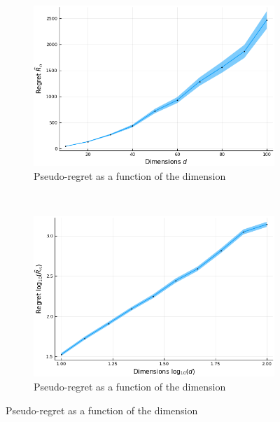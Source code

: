 \documentclass{article}
\begin{document}
\begin{figure}[h]
\centering
    \begin{subfigure}[h]{0.45\textwidth}
        \includegraphics[scale=0.4]{dim-regret.png}
        \caption{Pseudo-regret as a function of the dimension\label{fig:regret_dim}}
    \end{subfigure}~~~~
    \begin{subfigure}[h]{0.45\textwidth}
        \includegraphics[scale=0.4]{dim-regret-logspace.png}
        \caption{\label{fig:regret_dim_logscale}Pseudo-regret as a function of the dimension}
    \end{subfigure}
\end{figure}
\end{document}
